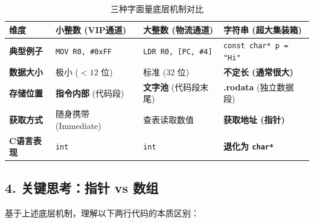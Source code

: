 \begin{table}[h]
\centering
\caption{三种字面量底层机制对比}\label{tab:literal-mechanism-compare}
\begin{tabular}{|l|l|l|l|}
\hline
\textbf{维度} & \textbf{小整数 (VIP通道)} & \textbf{大整数 (物流通道)} & \textbf{字符串 (超大集装箱)} \\ \hline
\textbf{典型例子} & \texttt{MOV R0, \#0xFF} & \texttt{LDR R0, [PC, \#4]} & \texttt{const char* p = "Hi"} \\ \hline
\textbf{数据大小} & 极小 ($<12$ 位) & 标准 (32 位) & \textbf{不定长 (通常很大)} \\ \hline
\textbf{存储位置} & \textbf{指令内部} (代码段) & \textbf{文字池} (代码段末尾) & \textbf{.rodata} (独立数据段) \\ \hline
\textbf{获取方式} & 随身携带 (Immediate) & 查表读取数值 & \textbf{获取地址 (指针)} \\ \hline
\textbf{C语言表现} & \texttt{int} & \texttt{int} & \textbf{退化为 \texttt{char*}} \\ \hline
\end{tabular}
\end{table}

































\subsection{4. 关键思考：指针 vs 数组}

基于上述底层机制，理解以下两行代码的本质区别：

